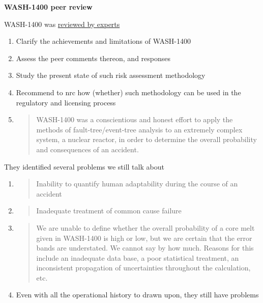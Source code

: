 \documentclass[aspectratio=1610,pdftex,dvipsnames,compress,xcolor={dvipsnames}]{beamer}
\newcommand{\acs}{\acrshort} %
\begin{document}
\begin{frame}[plain]{}
    \centering\LARGE\textbf{WASH-1400 peer review}
\end{frame}


\addtocounter{framenumber}{-1}
\begin{frame}{WASH-1400 was \href{http://www.iaea.org/inis/collection/NCLCollectionStore/_Public/10/452/10452296.pdf}{reviewed by experts}}
    \begin{enumerate}[series=outerlist,topsep=0pt,itemsep=7pt,leftmargin=*,label=(\arabic*)]
        \item Clarify the achievements and limitations of WASH-1400
        \item Assess the peer comments thereon, and responses
        \item Study the present state of such risk assessment methodology
        \item Recommend to \acs{nrc} how (whether) such methodology can be used in the regulatory and licensing process
            \vspace{0.25in}
        \item[]
            \begin{quote}
                WASH-1400 was a conscientious and honest effort to apply the methods of fault-tree/event-tree analysis to an extremely complex system, a nuclear reactor, in order to determine the overall probability and consequences of an accident.
            \end{quote}
    \end{enumerate}
\end{frame}


\begin{frame}{They identified several problems we still talk about}
    \begin{enumerate}[series=outerlist,topsep=0pt,itemsep=17pt,leftmargin=*,label=(\arabic*)]
        \item[]
            \begin{quote}
                Inability to quantify human adaptability during the course of an accident
            \end{quote}
        \item[]
            \begin{quote}
                Inadequate treatment of common cause failure 
            \end{quote}
        \item[]
            \begin{quote}
                We are unable to define whether the overall probability of a core melt given in WASH-1400 is high or low, but we are certain that the error bands are understated. We cannot say by how much. Reasons for this include an inadequate data base, a poor statistical treatment, an inconsistent propagation of uncertainties throughout the calculation, etc.
            \end{quote}
        \item[]Even with all the operational history to drawn upon, they still have problems
    \end{enumerate}
\end{frame}
\end{document}
